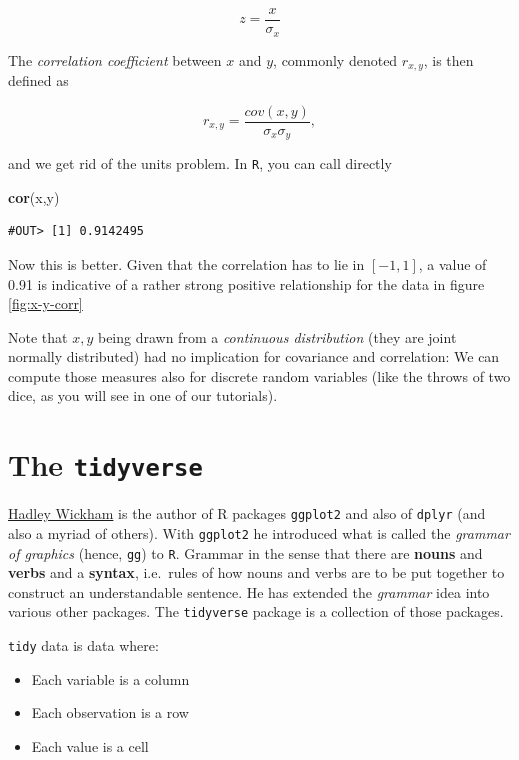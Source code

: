\documentclass[]{book}
\newenvironment{Shaded}{\begin{snugshade}}{\end{snugshade}}
\newcommand{\KeywordTok}[1]{\textcolor[rgb]{0.13,0.29,0.53}{\textbf{#1}}}
\newcommand{\NormalTok}[1]{#1}
\providecommand{\tightlist}{%
  \setlength{\itemsep}{0pt}\setlength{\parskip}{0pt}}
\theoremstyle{definition}
\theoremstyle{definition}
\theoremstyle{definition}
\theoremstyle{remark}
\begin{document}
\[
z = \frac{x}{\sigma_x}
\]

The \emph{correlation coefficient} between \(x\) and \(y\), commonly
denoted \(r_{x,y}\), is then defined as

\[
r_{x,y} = \frac{cov(x,y)}{\sigma_x \sigma_y},
\]

and we get rid of the units problem. In \texttt{R}, you can call
directly

\begin{Shaded}
\begin{Highlighting}[]
\KeywordTok{cor}\NormalTok{(x,y)}
\end{Highlighting}
\end{Shaded}

\begin{verbatim}
#OUT> [1] 0.9142495
\end{verbatim}

Now this is better. Given that the correlation has to lie in \([-1,1]\),
a value of 0.91 is indicative of a rather strong positive relationship
for the data in figure \ref{fig:x-y-corr}

Note that \(x,y\) being drawn from a \emph{continuous distribution}
(they are joint normally distributed) had no implication for covariance
and correlation: We can compute those measures also for discrete random
variables (like the throws of two dice, as you will see in one of our
tutorials).

\section{\texorpdfstring{The
\texttt{tidyverse}}{The tidyverse}}\label{the-tidyverse}

\href{http://hadley.nz}{Hadley Wickham} is the author of R packages
\texttt{ggplot2} and also of \texttt{dplyr} (and also a myriad of
others). With \texttt{ggplot2} he introduced what is called the
\emph{grammar of graphics} (hence, \texttt{gg}) to \texttt{R}. Grammar
in the sense that there are \textbf{nouns} and \textbf{verbs} and a
\textbf{syntax}, i.e.~rules of how nouns and verbs are to be put
together to construct an understandable sentence. He has extended the
\emph{grammar} idea into various other packages. The \texttt{tidyverse}
package is a collection of those packages.

\texttt{tidy} data is data where:

\begin{itemize}
\tightlist
\item
  Each variable is a column
\item
  Each observation is a row
\item
  Each value is a cell
\end{itemize}
\end{document}
